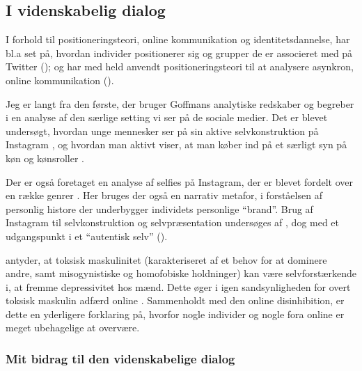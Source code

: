 \subsection{I videnskabelig dialog}

I forhold til positioneringsteori, online kommunikation og 
identitetsdannelse, har bl.a 
\citeauthor{lopezlongTweetingChoirReligious2012} set på, hvordan 
individer positionerer sig og grupper de er associeret med på 
Twitter (\citeyear{lopezlongTweetingChoirReligious2012}); og 
\citeauthor{dennenFacilitatorPresenceIdentity2011} har med held 
anvendt positioneringsteori til at analysere asynkron, online 
kommunikation (\citeyear{dennenFacilitatorPresenceIdentity2011}).

Jeg er langt fra den første, der bruger Goffmans analytiske 
redskaber og begreber i en analyse af den særlige setting vi ser 
på de sociale medier. Det er blevet undersøgt, hvordan unge 
mennesker ser på sin aktive selvkonstruktion på Instagram 
\autocite{seehaferNOFILTERExplorationInstagram2017a}, og hvordan 
man aktivt viser, at man køber ind på et særligt syn på køn og 
kønsroller \autocite{bakerGoodMorningFitfam2018}.

Der er også foretaget en analyse af selfies på Instagram, der er 
blevet fordelt over en række genrer 
\autocite{eagarClassifyingNarratedSelfie2016}. Her bruges der også 
en narrativ metafor, i forståelsen af personlig histore der 
underbygger individets personlige “brand”. Brug
af Instagram til selvkonstruktion og selvpræsentation undersøges 
af \citeauthor{lazebnaRoleCommunicationApprehension2015}, dog med 
et udgangspunkt i et “autentisk selv” 
(\citeyear{lazebnaRoleCommunicationApprehension2015}).

\citeauthor{parentSocialMediaBehavior2018} antyder, at toksisk 
maskulinitet (karakteriseret af et behov for at dominere andre, 
samt misogynistiske og homofobiske holdninger) kan være 
selvforstærkende i, at fremme depressivitet hos mænd. Dette øger i 
igen sandsynligheden for overt toksisk maskulin adfærd online 
\autocite{parentSocialMediaBehavior2018}. Sammenholdt med den 
online disinhibition, er dette en yderligere forklaring på, 
hvorfor nogle individer og nogle fora online er meget ubehagelige 
at overvære.

\subsubsection{Mit bidrag til den videnskabelige dialog}

